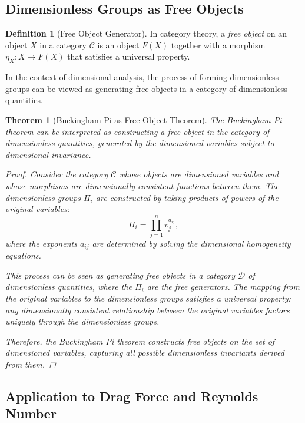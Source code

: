 \documentclass{article}
\newtheorem{theorem}{Theorem}[section]
\theoremstyle{definition}
\newtheorem{definition}{Definition}[section]
\theoremstyle{remark}
\begin{document}
	\subsection{Dimensionless Groups as Free Objects}
	
	\begin{definition}[Free Object Generator]
		In category theory, a \emph{free object} on an object $X$ in a category $\mathcal{C}$ is an object $F(X)$ together with a morphism $\eta_X: X \rightarrow F(X)$ that satisfies a universal property.
		
		In the context of dimensional analysis, the process of forming dimensionless groups can be viewed as generating free objects in a category of dimensionless quantities.
	\end{definition}
	
	\begin{theorem}[Buckingham Pi as Free Object Theorem]
		The Buckingham Pi theorem can be interpreted as constructing a free object in the category of dimensionless quantities, generated by the dimensioned variables subject to dimensional invariance.
		
		\begin{proof}
			Consider the category $\mathcal{C}$ whose objects are dimensioned variables and whose morphisms are dimensionally consistent functions between them. The dimensionless groups $\Pi_i$ are constructed by taking products of powers of the original variables:
			\[
			\Pi_i = \prod_{j=1}^n v_j^{a_{ij}},
			\]
			where the exponents $a_{ij}$ are determined by solving the dimensional homogeneity equations.
			
			This process can be seen as generating free objects in a category $\mathcal{D}$ of dimensionless quantities, where the $\Pi_i$ are the free generators. The mapping from the original variables to the dimensionless groups satisfies a universal property: any dimensionally consistent relationship between the original variables factors uniquely through the dimensionless groups.
			
			Therefore, the Buckingham Pi theorem constructs free objects on the set of dimensioned variables, capturing all possible dimensionless invariants derived from them.
		\end{proof}
	\end{theorem}
	
	\subsection{Application to Drag Force and Reynolds Number}
	
\end{document}
